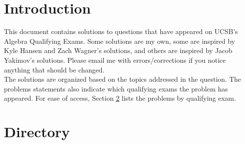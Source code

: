 \documentclass{article}
\theoremstyle{definition}
\begin{document}
\tableofcontents

\section{Introduction}

This document contains solutions to questions that have appeared on UCSB's Algebra Qualifying Exams. Some solutions are my own, some are inspired by Kyle Hansen and Zach Wagner's solutions, and others are inspired by Jacob Yakimov's solutions. Please email me with errors/corrections if you notice anything that should be changed.\\

The solutions are organized based on the topics addressed in the question. The problems statements also indicate which qualifying exams the problem has appeared. For ease of access, Section \ref{directory} lists the problems by qualifying exam.

\section{Directory}
\label{directory}
\end{document}
